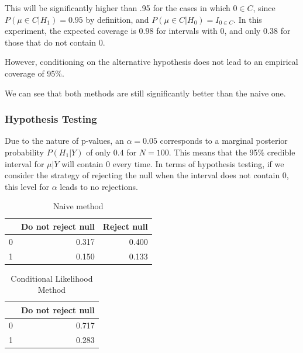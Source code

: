 \documentclass[AMA,STIX1COL]{WileyNJD-v2}\usepackage[]{graphicx}\usepackage[]{color}
\newenvironment{knitrout}{}{} %
\begin{document}
This will be significantly higher than .95 for the cases in which $0 \in C$, since $P(\mu \in C|H_1) =0.95$ by definition, and  $P(\mu \in C|H_0) = I_{0 \in C}$. In this experiment, the expected coverage is $0.98$ for intervals with 0, and only $0.38$ for those that do not contain 0. 

However, conditioning on the alternative hypothesis does not lead to an empirical coverage of 95\%.

We can see that both methods are still significantly better than the naive one.



\subsubsection{Hypothesis Testing}


Due to the nature of p-values, an $\alpha = 0.05$ corresponds to a marginal posterior probability $P(H_1 | Y )$ of only $0.4$ for $N = 100$. This means that the 95\% credible interval for $\mu| Y$ will contain 0 every time. In terms of hypothesis testing, if we consider the strategy of rejecting the null when the interval does not contain 0, this level for $\alpha$ leads to no rejections.

\begin{knitrout}
\color{fgcolor}\begin{table}

\caption{\label{tab:unnamed-chunk-16}Naive method}
\centering
\begin{tabular}[t]{l|r|r}
\hline
  & Do not reject null & Reject null\\
\hline
0 & 0.317 & 0.400\\
\hline
1 & 0.150 & 0.133\\
\hline
\end{tabular}
\end{table}


\end{knitrout}

\begin{knitrout}
\color{fgcolor}\begin{table}

\caption{\label{tab:unnamed-chunk-17}Conditional Likelihood Method}
\centering
\begin{tabular}[t]{l|r}
\hline
  & Do not reject null\\
\hline
0 & 0.717\\
\hline
1 & 0.283\\
\hline
\end{tabular}
\end{table}


\end{knitrout}
\end{document}
